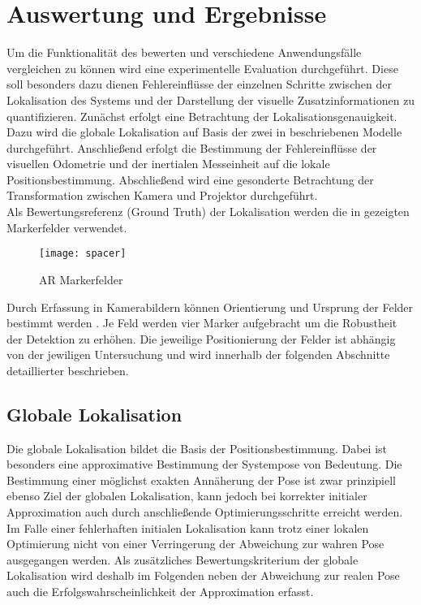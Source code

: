 \chapter{Auswertung und Ergebnisse}
\label{chap.results}

Um die Funktionalität des  bewerten und verschiedene Anwendungsfälle vergleichen zu können wird eine experimentelle Evaluation durchgeführt. Diese soll besonders dazu dienen Fehlereinflüsse der einzelnen Schritte zwischen der Lokalisation des Systems und der Darstellung der visuelle Zusatzinformationen zu quantifizieren. Zunächst erfolgt eine Betrachtung der Lokalisationsgenauigkeit. Dazu wird die globale Lokalisation auf Basis der zwei in  beschriebenen Modelle durchgeführt. Anschließend erfolgt die Bestimmung der Fehlereinflüsse der visuellen Odometrie und der inertialen Messeinheit auf die lokale Positionsbestimmung. Abschließend wird eine gesonderte Betrachtung der Transformation zwischen Kamera und Projektor durchgeführt.\\
Als Bewertungsreferenz (Ground Truth) der Lokalisation werden die in  gezeigten Markerfelder verwendet.

\begin{figure}[!ht]
	\begin{center}
		\texttt{[image: spacer]}
		\caption{AR Markerfelder}
		\label{fig.armarker}
	\end{center}
\end{figure}

Durch Erfassung in Kamerabildern können Orientierung und Ursprung der Felder bestimmt werden . Je Feld werden vier Marker aufgebracht um die Robustheit der Detektion zu erhöhen. Die jeweilige Positionierung der Felder ist abhängig von der jewiligen Untersuchung und wird innerhalb der folgenden Abschnitte detaillierter beschrieben. 

\section{Globale Lokalisation}
Die globale Lokalisation bildet die Basis der Positionsbestimmung. Dabei ist besonders eine approximative Bestimmung der Systempose von Bedeutung. Die Bestimmung einer möglichst exakten Annäherung der Pose ist zwar prinzipiell ebenso Ziel der globalen Lokalisation, kann jedoch bei korrekter initialer Approximation auch durch anschließende Optimierungsschritte erreicht werden. Im Falle einer fehlerhaften initialen Lokalisation kann trotz einer lokalen Optimierung nicht von einer Verringerung der Abweichung zur wahren Pose ausgegangen werden. Als zusätzliches Bewertungskriterium der globale Lokalisation wird deshalb im Folgenden neben der Abweichung zur realen Pose auch die Erfolgswahrscheinlichkeit der Approximation erfasst.\\

